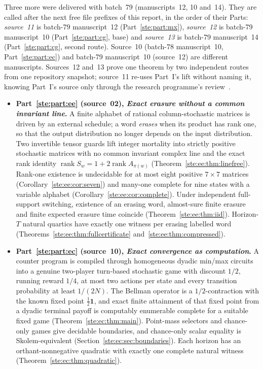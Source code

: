 \documentclass[11pt,letterpaper]{article}
\theoremstyle{definition}
\theoremstyle{remark}
\newcommand{\one}{\mathbf 1}
\newcommand{\rk}{\operatorname{rank}}
\begin{document}
Three more were delivered with batch~79 (manuscripts~12, 10 and~14). They are called after the next free file prefixes of this report, in the order of their Parts: \emph{source~11} is batch-79 manuscript~12 (Part~\ref{ste:part:mx}), \emph{source~12} is batch-79 manuscript~10 (Part~\ref{ste:part:cg}, base) and \emph{source~13} is batch-79 manuscript~14 (Part~\ref{ste:part:cg}, second route). Source~10 (batch-78 manuscript~10, Part~\ref{ste:part:ec}) and batch-79 manuscript~10 (source~12) are different manuscripts. Sources~12 and~13 prove one theorem by two independent routes from one repository snapshot; source~11 re-uses Part~I's lift without naming it, knowing Part~I's source only through the research programme's review~\cite{review1977}.

\begin{itemize}
\item \textbf{Part~\ref{ste:part:ee} (source~02), \emph{Exact erasure without a common invariant line}.} A finite alphabet of rational column-stochastic matrices is driven by an external schedule; a word \emph{erases} when its product has rank one, so that the output distribution no longer depends on the input distribution. Two invertible tensor guards lift integer mortality into strictly positive stochastic matrices with no common invariant complex line and the exact rank identity $\rk S_w=1+2\rk A_{\pi(w)}$ (Theorem~\ref{ste:ee:thm:linefree}). Rank-one existence is undecidable for at most eight positive $7\times7$ matrices (Corollary~\ref{ste:ee:cor:seven}) and many-one complete for nine states with a variable alphabet (Corollary~\ref{ste:ee:cor:complete}). Under independent full-support switching, existence of an erasing word, almost-sure finite erasure and finite expected erasure time coincide (Theorem~\ref{ste:ee:thm:iid}). Horizon-$T$ natural quartics have exactly one witness per erasing labelled word (Theorems~\ref{ste:ee:thm:fullcertificate} and~\ref{ste:ee:thm:compressed}).
\item \textbf{Part~\ref{ste:part:ec} (source~10), \emph{Exact convergence as computation}.} A counter program is compiled through homogeneous dyadic min/max circuits into a genuine two-player turn-based stochastic game with discount $1/2$, running reward $1/4$, at most two actions per state and every transition probability at least $1/(2N)$. The Bellman operator is a $1/2$-contraction with the known fixed point $\tfrac12\one$, and exact finite attainment of that fixed point from a dyadic terminal payoff is computably enumerable complete for a suitable fixed game (Theorem~\ref{ste:ec:thm:main}). Point-mass selectors and chance-only games give decidable boundaries, and chance-only scalar equality is Skolem-equivalent (Section~\ref{ste:ec:sec:boundaries}). Each horizon has an orthant-nonnegative quadratic with exactly one complete natural witness (Theorem~\ref{ste:ec:thm:quadratic}).

\end{itemize}
\end{document}
